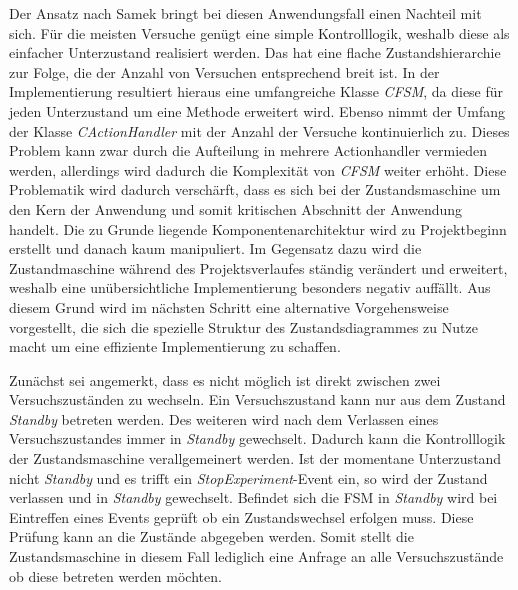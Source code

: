 Der Ansatz nach Samek bringt bei diesen Anwendungsfall einen Nachteil mit sich. Für die meisten Versuche genügt eine simple Kontrolllogik, weshalb diese als einfacher Unterzustand realisiert werden. Das hat eine flache Zustandshierarchie zur Folge, die der Anzahl von Versuchen entsprechend breit ist. In der Implementierung resultiert hieraus eine umfangreiche Klasse \textit{CFSM}, da diese für jeden Unterzustand um eine Methode erweitert wird. Ebenso nimmt der Umfang der Klasse \textit{CActionHandler} mit der Anzahl der Versuche kontinuierlich zu. Dieses Problem kann zwar durch die Aufteilung in mehrere Actionhandler vermieden werden, allerdings wird dadurch die Komplexität von \textit{CFSM} weiter erhöht. Diese Problematik wird dadurch verschärft, dass es sich bei der Zustandsmaschine um den Kern der Anwendung und somit kritischen Abschnitt der Anwendung handelt. Die zu Grunde liegende Komponentenarchitektur wird zu Projektbeginn erstellt und danach kaum manipuliert. Im Gegensatz dazu wird die Zustandmaschine während des Projektsverlaufes ständig verändert und erweitert, weshalb eine unübersichtliche Implementierung besonders negativ auffällt. Aus diesem Grund wird im nächsten Schritt eine alternative Vorgehensweise vorgestellt, die sich die spezielle Struktur des Zustandsdiagrammes zu Nutze macht um eine effiziente Implementierung zu schaffen.

Zunächst sei angemerkt, dass es nicht möglich ist direkt zwischen zwei Versuchszuständen zu wechseln. Ein Versuchszustand kann nur aus dem Zustand \textit{Standby} betreten werden. Des weiteren wird nach dem Verlassen eines Versuchszustandes immer in \textit{Standby} gewechselt. Dadurch kann die Kontrolllogik der Zustandsmaschine verallgemeinert werden. Ist der momentane Unterzustand nicht \textit{Standby} und es trifft ein \textit{StopExperiment}-Event ein, so wird der Zustand verlassen und in \textit{Standby} gewechselt. Befindet sich die FSM in \textit{Standby} wird bei Eintreffen eines Events geprüft ob ein Zustandswechsel erfolgen muss. Diese Prüfung kann an die Zustände abgegeben werden. Somit stellt die Zustandsmaschine in diesem Fall lediglich eine Anfrage an alle Versuchszustände ob diese betreten werden möchten.

